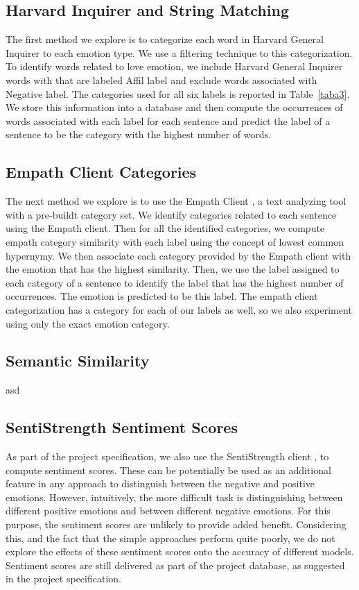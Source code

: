 \documentclass[conference]{IEEEtran}
\begin{document}
\subsection{Harvard Inquirer and String Matching}
The first method we explore is to categorize each word in Harvard General Inquirer \cite{harvardgeneralinquirer} to each emotion type. We use a filtering technique to this categorization. To identify words related to love emotion, we include Harvard General Inquirer words with that are labeled Affil label and exclude words associated with Negative label. The categories used for all six labels is reported in Table~\ref{taba3}. We store this information into a database and then compute the occurrences of words associated with each label for each sentence and predict the label of a sentence to be the category with the highest number of words.

\subsection{Empath Client Categories}
The next method we explore is to use the Empath Client \cite{empathclient}, a text analyzing tool with a pre-buildt category set. We identify categories related to each sentence using the Empath client. Then for all the identified categories, we compute empath category similarity with each label using the concept of lowest common hypernymy. We then associate each category provided by the Empath client with the emotion that has the highest similarity. Then, we use the label assigned to each category of a sentence to identify the label that has the highest number of occurrences. The emotion is predicted to be this label. The empath client categorization has a category for each of our labels as well, so we also experiment using only the exact emotion category.
\subsection{Semantic Similarity}
asd
\subsection{SentiStrength Sentiment Scores}
As part of the project specification, we also use the SentiStrength client \cite{sentistrength}, to compute sentiment scores. These can be potentially be used as an additional feature in any approach to distinguish between the negative and positive emotions. However, intuitively, the more difficult task is distinguishing between different positive emotions and between different negative emotions. For this purpose, the sentiment scores are unlikely to provide added benefit. Considering this, and the fact that the simple approaches perform quite poorly, we do not explore the effects of these sentiment scores onto the accuracy of different models. Sentiment scores are still delivered as part of the project database, as suggested in the project specification.
\end{document}
